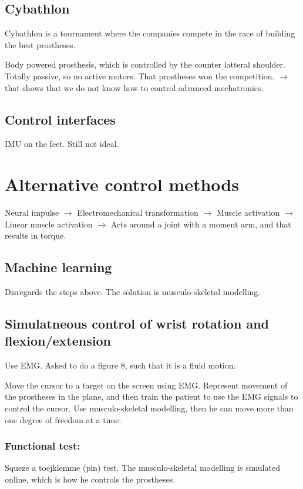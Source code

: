 \documentclass[a4paper]{article}
\begin{document}
\vspace{5pt}



\subsection{Cybathlon}
Cybathlon is a tournament where the companies compete in the race of building the best prostheses. 

Body powered prosthesis, which is controlled by the counter latteral shoulder. Totally passive, so no active motors. That prostheses won the competition. $ \rightarrow $ that shows that we do not know how to control advanced mechatronics.  

\subsection{Control interfaces}
IMU on the feet. Still not ideal. 


\section{Alternative control methods}
Neural impulse $ \rightarrow $ Electromechanical transformation $ \rightarrow $ Muscle activation $ \rightarrow $ Linear muscle activation $ \rightarrow $ Acts around a joint with a moment arm, and that results in torque. 

\subsection{Machine learning}
Disregards the steps above. The solution is musculo-skeletal modelling.

\subsection{Simulatneous control of wrist rotation and flexion/extension}
Use EMG. Asked to do a figure 8, such that it is a fluid motion. 

Move the cursor to a target on the screen using EMG. Represent movement of the prostheses in the plane, and then train the patient to use the EMG signals to control the cursor.  
Use musculo-skeletal modelling, then he can move more than one degree of freedom at a time. 

\subsubsection{Functional test:}
Squeze a toejklemme (pin) test. The musculo-skeletal modelling is simulated online, which is how he controls the prostheses. 
\end{document}

